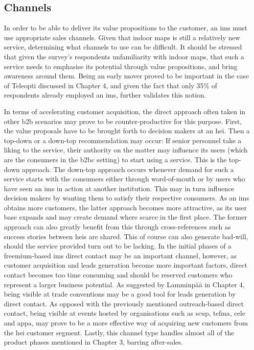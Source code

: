 \subsection{Channels}
In order to be able to deliver its value propositions to the customer, an \gls{ims} must use appropriate sales channels. Given that indoor maps is still a relatively new service, determining what channels to use can be difficult. It should be stressed that given the survey's respondents unfamiliarity with indoor maps, that such a service needs to emphasise its potential through value propositions, and bring awareness around them. Being an early mover proved to be important in the case of Teleopti discussed in Chapter 4, and given the fact that only 35\% of respondents already employed an \gls{ims}, further validates this notion. 


In terms of accelerating customer acquisition, the direct approach often taken in other \gls{b2b} scenarios may prove to be counter-productive for this purpose. First, the value proposals have to be brought forth to decision makers at an \gls{hei}. Then a top-down or a down-top recommendation may occur: If senior personnel take a liking to the service, their authority on the matter may influence its users (which are the consumers in the \gls{b2bc} setting) to start using a service. This is the top-down approach. The down-top approach occurs whenever demand for such a service starts with the consumers either through word-of-mouth or by users who have seen an \gls{ims} in action at another institution. This may in turn influence decision makers by wanting them to satisfy their respective consumers. As an \gls{ims} obtains more customers, the latter approach becomes more attractive, as its user base expands and may create demand where scarce in the first place. The former approach can also greatly benefit from this through cross-references such as success stories between \glspl{hei} are shared. This of course can also generate bad-will, should the service provided turn out to be lacking. In the initial phases of a freemium-based \gls{ims} direct contact may be an important channel, however, as customer acquisition and leads generation become more important factors, direct contact becomes too time consuming and should be reserved customers who represent a larger business potential. As suggested by Lamminpää in Chapter 4, being visible at trade conventions may be a good tool for leads generation by direct contact. As opposed with the previously mentioned outreach-based direct contact, being visible at events hosted by organisations such as \gls{scup}, \gls{tefma}, \gls{cele} and \gls{appa}, may prove to be a more effective way of acquiring new customers from the \gls{hei} customer segment. Lastly, this channel type handles almost all of the product phases mentioned in Chapter 3, barring after-sales.



